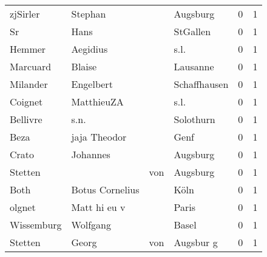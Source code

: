 \begin{center}
\begin{tiny}
\begin{longtabu}{llllrr}
                 zjSirler &                            Stephan &             &                                    Augsburg &          0 &         1 \\
                       Sr &                               Hans &             &                                    StGallen &          0 &         1 \\
                   Hemmer &                           Aegidius &             &                                        s.l. &          0 &         1 \\
                 Marcuard &                             Blaise &             &                                    Lausanne &          0 &         1 \\
                 Milander &                          Engelbert &             &                                Schaffhausen &          0 &         1 \\
                  Coignet &                         MatthieuZA &             &                                        s.l. &          0 &         1 \\
                 Bellivre &                               s.n. &             &                                   Solothurn &          0 &         1 \\
                     Beza &                       jaja Theodor &             &                                        Genf &          0 &         1 \\
                    Crato &                           Johannes &             &                                    Augsburg &          0 &         1 \\
                  Stetten &                                    &         von &                                    Augsburg &          0 &         1 \\
                     Both &                    Botus Cornelius &             &                                        Köln &          0 &         1 \\
                   olgnet &                       Matt hi eu v &             &                                       Paris &          0 &         1 \\
               Wissemburg &                           Wolfgang &             &                                       Basel &          0 &         1 \\
                  Stetten &                              Georg &         von &                                   Augsbur g &          0 &         1 \\

\end{longtabu}
\end{tiny}
\end{center}
